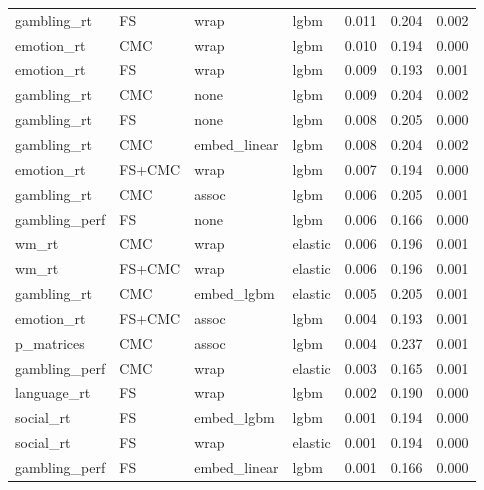 \documentclass{article}
\begin{document}
\begin{longtable}{llllrrr}
	gambling\_rt & FS & wrap & lgbm & 0.011 & 0.204 & 0.002 \\
	emotion\_rt & CMC & wrap & lgbm & 0.010 & 0.194 & 0.000 \\
	emotion\_rt & FS & wrap & lgbm & 0.009 & 0.193 & 0.001 \\
	gambling\_rt & CMC & none & lgbm & 0.009 & 0.204 & 0.002 \\
	gambling\_rt & FS & none & lgbm & 0.008 & 0.205 & 0.000 \\
	gambling\_rt & CMC & embed\_linear & lgbm & 0.008 & 0.204 & 0.002 \\
	emotion\_rt & FS+CMC & wrap & lgbm & 0.007 & 0.194 & 0.000 \\
	gambling\_rt & CMC & assoc & lgbm & 0.006 & 0.205 & 0.001 \\
	gambling\_perf & FS & none & lgbm & 0.006 & 0.166 & 0.000 \\
	wm\_rt & CMC & wrap & elastic & 0.006 & 0.196 & 0.001 \\
	wm\_rt & FS+CMC & wrap & elastic & 0.006 & 0.196 & 0.001 \\
	gambling\_rt & CMC & embed\_lgbm & elastic & 0.005 & 0.205 & 0.001 \\
	emotion\_rt & FS+CMC & assoc & lgbm & 0.004 & 0.193 & 0.001 \\
	p\_matrices & CMC & assoc & lgbm & 0.004 & 0.237 & 0.001 \\
	gambling\_perf & CMC & wrap & elastic & 0.003 & 0.165 & 0.001 \\
	language\_rt & FS & wrap & lgbm & 0.002 & 0.190 & 0.000 \\
	social\_rt & FS & embed\_lgbm & lgbm & 0.001 & 0.194 & 0.000 \\
	social\_rt & FS & wrap & elastic & 0.001 & 0.194 & 0.000 \\
	gambling\_perf & FS & embed\_linear & lgbm & 0.001 & 0.166 & 0.000 \\
\end{longtable}



\end{document}
